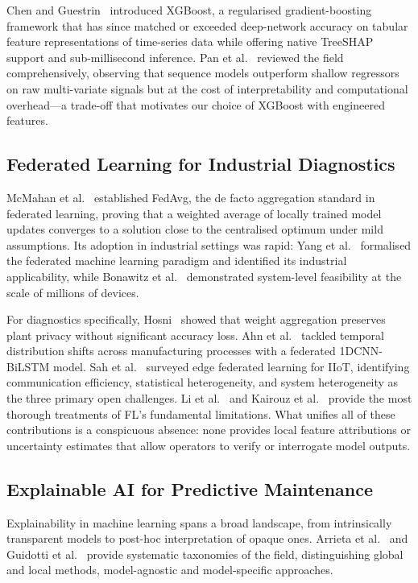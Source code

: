\documentclass[10pt, journal, letterpaper]{IEEEtran}
\begin{document}
Chen and Guestrin~\cite{chen2016xgboost} introduced XGBoost, a regularised
gradient-boosting framework that has since matched or exceeded deep-network
accuracy on tabular feature representations of time-series data while offering
native TreeSHAP support and sub-millisecond inference. Pan et al.~\cite{pan2025}
reviewed the field comprehensively, observing that sequence models outperform
shallow regressors on raw multi-variate signals but at the cost of
interpretability and computational overhead—a trade-off that motivates our
choice of XGBoost with engineered features.

\subsection{Federated Learning for Industrial Diagnostics}

McMahan et al.~\cite{mcmahan2017} established FedAvg, the de facto aggregation
standard in federated learning, proving that a weighted average of locally
trained model updates converges to a solution close to the centralised
optimum under mild assumptions. Its adoption in industrial settings was rapid:
Yang et al.~\cite{yang2019fl} formalised the federated machine learning
paradigm and identified its industrial applicability, while Bonawitz et
al.~\cite{bonawitz2019} demonstrated system-level feasibility at the scale of
millions of devices.

For diagnostics specifically, Hosni~\cite{hosni2026} showed that weight
aggregation preserves plant privacy without significant accuracy loss. Ahn et
al.~\cite{ahn2023} tackled temporal distribution shifts across manufacturing
processes with a federated 1DCNN-BiLSTM model. Sah et al.~\cite{sah2025}
surveyed edge federated learning for IIoT, identifying communication
efficiency, statistical heterogeneity, and system heterogeneity as the
three primary open challenges. Li et al.~\cite{li2020fl} and Kairouz et
al.~\cite{kairouz2021} provide the most thorough treatments of FL's fundamental
limitations. What unifies all of these contributions is a conspicuous absence:
none provides local feature attributions or uncertainty estimates that allow
operators to verify or interrogate model outputs.

\subsection{Explainable AI for Predictive Maintenance}

Explainability in machine learning spans a broad landscape, from intrinsically
transparent models to post-hoc interpretation of opaque ones. Arrieta et
al.~\cite{arrieta2020} and Guidotti et al.~\cite{guidotti2019} provide
systematic taxonomies of the field, distinguishing global and local methods,
model-agnostic and model-specific approaches.
\end{document}
